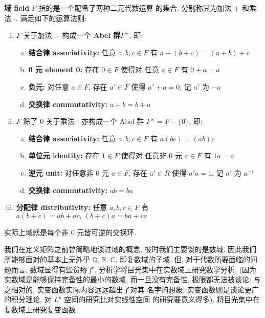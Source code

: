 \documentclass[UTF8]{book}
\begin{document}
\begin{definition}
    \textbf{域 field} $F$ 指的是一个配备了两种二元代数运算
    的集合, 分别称其为加法 $+$ 和乘法 $\cdot$. 满足如下的运算法则: 
    \begin{enumerate}[(i)]
        \item $F$ 关于加法 $+$ 构成一个\textbf{ Abel 群}$F^{+}$, 即:
            \begin{enumerate}[(a)]
                \item \textbf{结合律 associativity:} 任意 $a,b,c \in F$ 有
                $a+(b+c) = (a+b)+c$
                \item \textbf{0 元 element 0:} 存在 $ 0 \in F$ 使得对
                任意 $a\in F$ 有 $ 0+a = a$
                \item \textbf{负元:} 对任意 $a\in F$, 存在 $a' \in F$ 
                使得 $a' + a = 0$, 记 $a'$ 为 $-a$
                \item \textbf{交换律 commutativity:} $ a+b =b+a$
            \end{enumerate}
            \item $F$ 除了 0 关于乘法 $\cdot$ 亦构成一个 Abel 群
             $ F^{\times} = F - \{0\} $, 即:
            \begin{enumerate}[(a)]
                \item \textbf{结合律 associativity:} 任意 $a,b,c \in F$ 有
                $a(bc) = (ab)c$
                \item \textbf{单位元 identity:} 存在 $ 1 \in F$ 使得对
                任意非 0 元 $a\in F$ 有 $ 1a = a$
                \item \textbf{逆元 unit:} 对任意非 0 元 $a\in F$, 存在 $a' \in R$ 
                使得 $a'a = 1$, 记 $a'$ 为 $a^{-1}$
                \item \textbf{交换律 commutativity:} $ ab =ba$
            \end{enumerate}
        \item \textbf{分配律 distributivity:} 任意 $a,b,c \in F$ 有
        $ a(b+c) = ab + ac,\, (b+c)a = ba + ca$
    \end{enumerate}
\end{definition}

实际上域就是每个非 0 元皆可逆的交换环. 

我们在定义矩阵之前曾简略地谈过域的概念, 彼时我们主要谈的是数域. 
因此我们所能够面对的基本上无外乎 $\mathbb{Q},\,\mathbb{R},\,\mathbb{C}$, 
即复数域的子域. 但, 对于代数所要面临的问题而言, 数域显得有些贫瘠了. 
分析学将目光集中在实数域上研究数学分析, (因为实数域是能够保持完备性的最小的数域, 
而一旦没有完备性, 极限都无法被谈论; 与之相对的, 实变函数实际内容远远超出了对其
名字的想象, 实变函数则是谈论更广的积分理论, 对 $L^{p}$ 空间的研究比对实线性空间
的研究要意义得多), 将目光集中在复数域上研究复变函数. 
\end{document}
